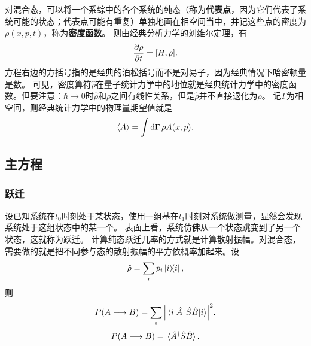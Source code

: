 \documentclass[hyperref, UTF8, a4paper]{ctexart}
\begin{document}
对混合态，可以将一个系综中的各个系统的纯态（称为\textbf{代表点}，因为它们代表了系统可能的状态；代表点可能有重复）单独地画在相空间当中，并记这些点的密度为$\rho(x, p, t)$，称为\textbf{密度函数}。
则由经典分析力学的刘维尔定理，有
\begin{equation}
    \pdv{\rho}{t} = [H, \rho].
\end{equation}
方程右边的方括号指的是经典的泊松括号而不是对易子，因为经典情况下哈密顿量是数。
可见，密度算符$\hat{\rho}$在量子统计力学中的地位就是经典统计力学中的密度函数。但要注意：$\hbar\to 0$时$\hat{\rho}$和$\rho$之间有线性关系，但是$\hat{\rho}$并不直接退化为$\rho$。
记$\Gamma$为相空间，则经典统计力学中的物理量期望值就是
\begin{equation}
    \expval{A} = \int \dd{\Gamma} \rho A(x, p).
\end{equation}

\subsection{主方程}




\subsubsection{跃迁}

设已知系统在$t_0$时刻处于某状态，使用一组基在$t_1$时刻对系统做测量，显然会发现系统处于这组状态中的某一个。
表面上看，系统仿佛从一个状态跳变到了另一个状态，这就称为跃迁。
计算纯态跃迁几率的方式就是计算散射振幅。对混合态，需要做的就是把不同参与态的散射振幅的平方依概率加起来。设
\[
    \hat{\rho} = \sum_i p_i \dyad{i},
\]
则
\[
    P(A \longrightarrow B) = \sum_i \abs{\mel{i}{\hat{A}^\dagger \hat{S} \hat{B}}{i}}^2.
\]
\begin{equation}
    P(A \longrightarrow B) = \expval*{\hat{A}^\dagger \hat{S} \hat{B}}.
\end{equation}
\end{document}
